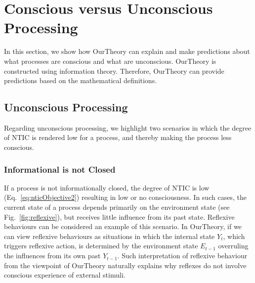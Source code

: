 \documentclass[utf8]{article}
\begin{document}
	\section{Conscious versus Unconscious Processing}\label{sec:Conscious versus Unconscious Processing}
	    In this section, we show how \ac{OurTheory} can explain and make predictions about what processes are conscious and what are unconscious. \ac{OurTheory} is constructed using information theory. Therefore, \ac{OurTheory} can provide predictions based on the mathematical definitions. 
		
        \subsection{Unconscious Processing}
            Regarding unconscious processing, we highlight two scenarios in which the degree of NTIC is rendered low for a process, and thereby making the process less conscious.
        
            \subsubsection*{Informational is not Closed}\label{sec:reflexive}
                If a process is not informationally closed, the degree of NTIC is low (Eq.~\ref{eq:nticObjective2}) resulting in low or no consciousness. In such cases, the current state of a process depends primarily on the environment state (see Fig.~\ref{fig:reflexive}), but receives little influence from its past state. Reflexive behaviours \citep{casali2013theoretically} can be considered an example of this scenario. In \ac{OurTheory}, if we can view reflexive behaviours as situations in which the internal state $Y_t$, which triggers reflexive action, is determined by the environment state $E_{t-1}$ overruling the influences from its own past $Y_{t-1}$.  Such interpretation of reflexive behaviour from the viewpoint of \ac{OurTheory} naturally explains why reflexes do not involve conscious experience of external stimuli. 
\end{document}
